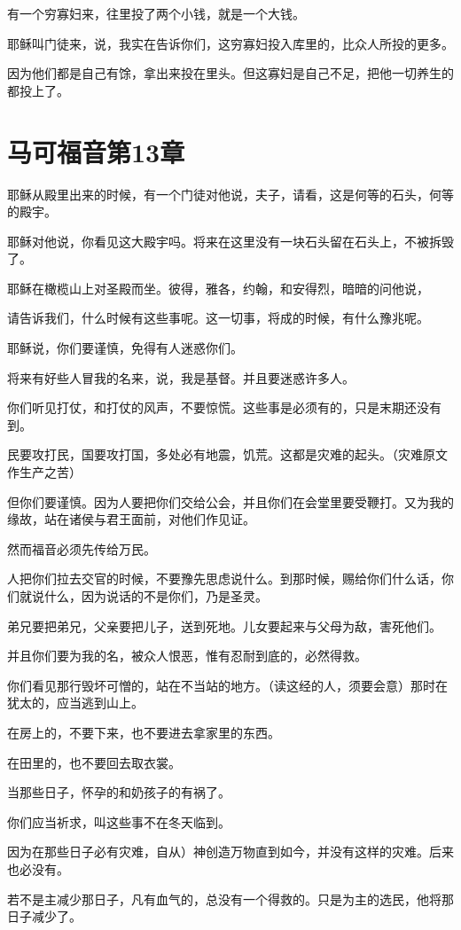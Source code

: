 \documentclass[12pt,oneside]{book}
\begin{document}
有一个穷寡妇来，往里投了两个小钱，就是一个大钱。

耶稣叫门徒来，说，我实在告诉你们，这穷寡妇投入库里的，比众人所投的更多。

因为他们都是自己有馀，拿出来投在里头。但这寡妇是自己不足，把他一切养生的都投上了。

\chapter{马可福音第13章}
耶稣从殿里出来的时候，有一个门徒对他说，夫子，请看，这是何等的石头，何等的殿宇。

耶稣对他说，你看见这大殿宇吗。将来在这里没有一块石头留在石头上，不被拆毁了。

耶稣在橄榄山上对圣殿而坐。彼得，雅各，约翰，和安得烈，暗暗的问他说，

请告诉我们，什么时候有这些事呢。这一切事，将成的时候，有什么豫兆呢。

耶稣说，你们要谨慎，免得有人迷惑你们。

将来有好些人冒我的名来，说，我是基督。并且要迷惑许多人。

你们听见打仗，和打仗的风声，不要惊慌。这些事是必须有的，只是末期还没有到。

民要攻打民，国要攻打国，多处必有地震，饥荒。这都是灾难的起头。（灾难原文作生产之苦）

但你们要谨慎。因为人要把你们交给公会，并且你们在会堂里要受鞭打。又为我的缘故，站在诸侯与君王面前，对他们作见证。

然而福音必须先传给万民。

人把你们拉去交官的时候，不要豫先思虑说什么。到那时候，赐给你们什么话，你们就说什么，因为说话的不是你们，乃是圣灵。

弟兄要把弟兄，父亲要把儿子，送到死地。儿女要起来与父母为敌，害死他们。

并且你们要为我的名，被众人恨恶，惟有忍耐到底的，必然得救。

你们看见那行毁坏可憎的，站在不当站的地方。（读这经的人，须要会意）那时在犹太的，应当逃到山上。

在房上的，不要下来，也不要进去拿家里的东西。

在田里的，也不要回去取衣裳。

当那些日子，怀孕的和奶孩子的有祸了。

你们应当祈求，叫这些事不在冬天临到。

因为在那些日子必有灾难，自从）神创造万物直到如今，并没有这样的灾难。后来也必没有。

若不是主减少那日子，凡有血气的，总没有一个得救的。只是为主的选民，他将那日子减少了。
\end{document}
